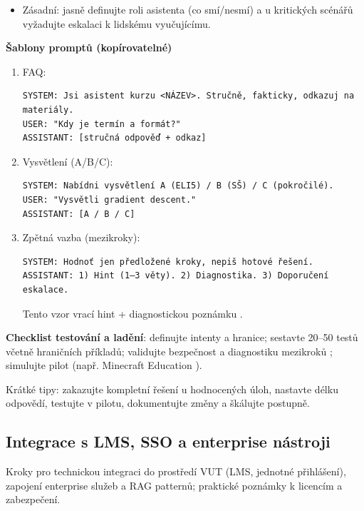 \documentclass{report}%
\begin{document}
\bigskip

\begin{itemize}
  \item Zásadní: jasně definujte roli asistenta (co smí/nesmí) a u kritických scénářů vyžadujte eskalaci k lidskému vyučujícímu.
\end{itemize}

\medskip

\textbf{Šablony promptů (kopírovatelné)}
\begin{enumerate}
  \item FAQ:
\begin{verbatim}
SYSTEM: Jsi asistent kurzu <NÁZEV>. Stručně, fakticky, odkazuj na materiály.
USER: "Kdy je termín a formát?"
ASSISTANT: [stručná odpověď + odkaz]
\end{verbatim}
  \item Vysvětlení (A/B/C):
\begin{verbatim}
SYSTEM: Nabídni vysvětlení A (ELI5) / B (SŠ) / C (pokročilé).
USER: "Vysvětli gradient descent."
ASSISTANT: [A / B / C]
\end{verbatim}
  \item Zpětná vazba (mezikroky):
\begin{verbatim}
SYSTEM: Hodnoť jen předložené kroky, nepiš hotové řešení.
ASSISTANT: 1) Hint (1–3 věty). 2) Diagnostika. 3) Doporučení eskalace.
\end{verbatim}
Tento vzor vrací hint + diagnostickou poznámku \cite{kb_ai_101_tipu_pdf_04e4a115_page_8_1}.
\end{enumerate}

\textbf{Checklist testování a ladění}: definujte intenty a hranice; sestavte 20–50 testů včetně hraničních příkladů; validujte bezpečnost a diagnostiku mezikroků \cite{kb_ai_101_tipu_pdf_04e4a115_page_8_1}; simulujte pilot (např. Minecraft Education \cite{kb_ai_101_tipu_pdf_04e4a115_page_15_2}).

Krátké tipy: zakazujte kompletní řešení u hodnocených úloh, nastavte délku odpovědí, testujte v pilotu, dokumentujte změny a škálujte postupně.%

%
\subsection{Integrace s LMS, SSO a enterprise nástroji}%
Kroky pro technickou integraci do prostředí VUT (LMS, jednotné přihlášení), zapojení enterprise služeb a RAG patternů; praktické poznámky k licencím a zabezpečení.%
\end{document}
